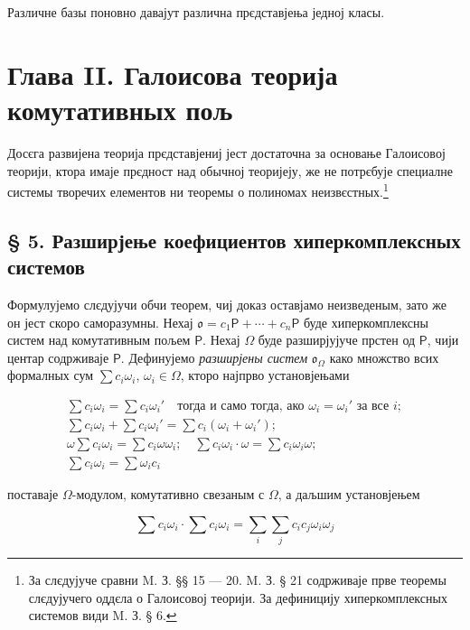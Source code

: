 \documentclass[11pt]{article}
\newcommand{\srcfn}[2]{\footnote{#2}}
\begin{document}
Различне базы поновно давајут различна прєдставјења једној класы.

\section*{Глава II. Галоисова теорија комутативных пољ}\label{kapitel-ii.-galoissche-theorie-kommutativer-koerper}

Досєга развијена теорија прєдставјениј јест достаточна за основање Галоисовој теорији, ктора имаје прєдност над обычној теоријеју, же не потрєбује специалне системы творечих елементов ни теоремы о полиномах неизвєстных.\srcfn{1}{За слєдујуче сравни M. З. §§ 15 --- 20. M. З. § 21 содрживаје прве теоремы слєдујучего оддєла о Галоисовој теорији. За дефиницију хиперкомплексных системов види M. З. § 6.}

\subsection*{§ 5. Разширјење коефициентов хиперкомплексных системов}\label{koeffizientenerweiterung-hyperkomplexer-systeme}

Формулујемо слєдујучи обчи теорем, чиј доказ оставјамо неизведеным, зато же он јест скоро саморазумны. Нехај \(\mathfrak{o}=c_1\mathsf P+\cdots+c_n\mathsf P\) буде хиперкомплексны систем над комутативным пољем \(\mathsf P\). Нехај \(\Omega\) буде разширјујуче прстен од \(\mathsf P\), чији центар содрживаје \(\mathsf P\). Дефинујемо \emph{разширјены систем} \(\mathfrak{o}_{\Omega}\) како множство всих формалных сум \(\sum c_i\omega_i\), \(\omega_i\in\Omega\), кторо најпрво установјењами

\[
\begin{array}{l}
\sum c_i\omega_i=\sum c_i\omega_i' \quad\text{тогда и само тогда, ако } \omega_i=\omega_i' \text{ за все } i;\\
\sum c_i\omega_i+\sum c_i\omega_i'=\sum c_i(\omega_i+\omega_i');\\
\omega\sum c_i\omega_i=\sum c_i\omega\omega_i;\quad
\sum c_i\omega_i\cdot\omega=\sum c_i\omega_i\omega;\\
\sum c_i\omega_i=\sum \omega_i c_i
\end{array}
\]

поставаје \(\Omega\)-модулом, комутативно свезаным с \(\Omega\), а даљшим установјењем

\[
\sum c_i\omega_i\cdot \sum c_i\omega_i
=\sum_i\sum_j c_ic_j\omega_i\omega_j
\]
\end{document}
